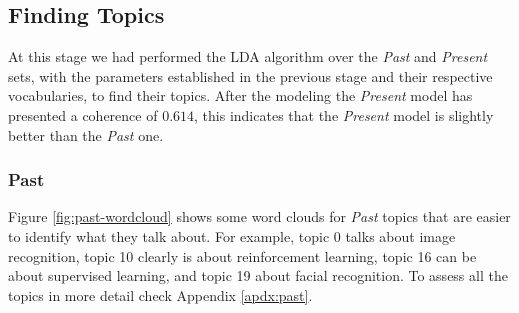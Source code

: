 \subsection{Finding Topics}

At this stage we had performed the LDA algorithm over the \textit{Past} and \textit{Present} sets, with the parameters established in the previous stage and their respective vocabularies, to find their topics. After the modeling the \textit{Present} model has presented a coherence of $0.614$, this indicates that the \textit{Present} model is slightly better than the \textit{Past} one.

\subsubsection{Past}

Figure \ref{fig:past-wordcloud} shows some word clouds for \textit{Past} topics that are easier to identify what they talk about. For example, topic 0 talks about image recognition, topic 10 clearly is about reinforcement learning, topic 16 can be about supervised learning, and topic 19 about facial recognition. To assess all the topics in more detail check Appendix \ref{apdx:past}.

